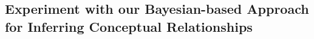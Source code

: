 \documentclass[1p]{elsarticle}
\begin{document}
\subsection{Experiment with our Bayesian-based Approach for Inferring Conceptual Relationships}\label{c7sExperimentBayesian}
% 
% 
% 
\end{document}
